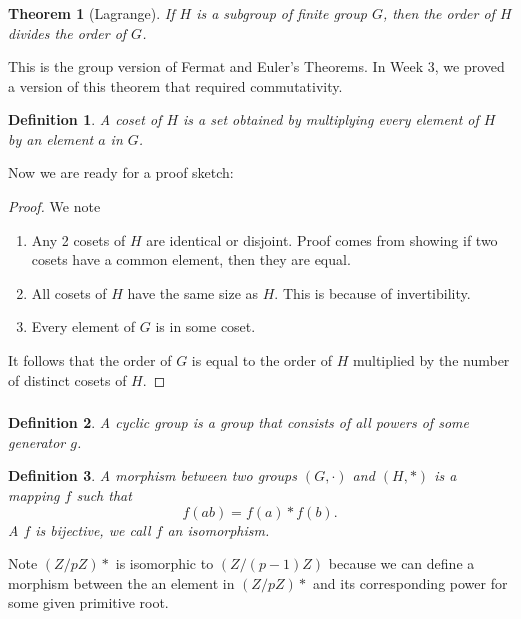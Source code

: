 \documentclass{article}
\newtheorem{theorem}{Theorem}
\newtheorem{definition}{Definition}
\begin{document}
\subsubsection{}
\begin{theorem}[Lagrange]
    If $H$ is a subgroup of finite group $G$, then the order of $H$ divides the order of $G$.
\end{theorem}
This is the group version of Fermat and Euler's Theorems. In Week 3, we proved a version of this theorem that required commutativity.
\begin{definition}
    A coset of $H$ is a set obtained by multiplying every element of $H$ by an element $a$ in $G$.
\end{definition}
Now we are ready for a proof sketch:
\begin{proof}
We note
\begin{enumerate}
    \item Any 2 cosets of $H$ are identical or disjoint. Proof comes from showing if two cosets have a common element, then they are equal.
    \item All cosets of $H$ have the same size as $H$. This is because of invertibility.
    \item Every element of $G$ is in some coset.
\end{enumerate}
It follows that the order of $G$ is equal to the order of $H$ multiplied by the number of distinct cosets of $H$.
\end{proof}

\subsubsection{}
\begin{definition}
    A cyclic group is a group that consists of all powers of some generator $g$.
\end{definition}
\begin{definition}
    A morphism between two groups $(G, \cdot)$ and $(H, *)$ is a mapping $f$ such that
    \begin{equation}
        f(ab) = f(a) * f(b).
    \end{equation}
    A $f$ is bijective, we call $f$ an isomorphism.
\end{definition}
Note $(Z/pZ)*$ is isomorphic to $(Z/(p-1)Z)$ because we can define a morphism between the an element in $(Z/pZ)*$ and its corresponding power for some given primitive root.
\end{document}
